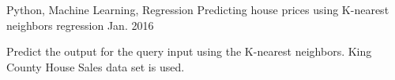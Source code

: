 \begin{cventries}
  \cventry
    {Python, Machine Learning, Regression}
    {Predicting house prices using K-nearest neighbors regression}
    {}
    {Jan. 2016}
    {
      \begin{cvitems}
        \item {Predict the output for the query input using the K-nearest neighbors. King County House Sales data set is used.}
      \end{cvitems}
    }

\end{cventries}
